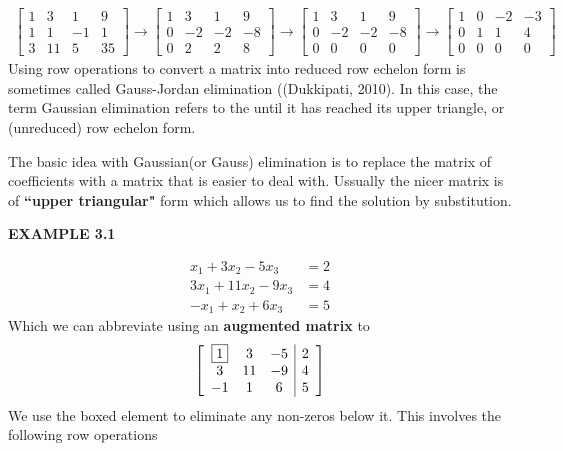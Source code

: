 \documentclass[a4paper, 12pt]{report}
\newcommand{\sps}{\\[0.2cm]}
\begin{document}
{     \begin{align*}
     \begin{bmatrix}1& 3& 1& 9 \\ 1& 1& -1& 1\\ 3& 11& 5& 35 \end{bmatrix}
     \to
     \begin{bmatrix} 1& 3& 1& 9 \\ 0& -2& -2& -8\\ 0& 2& 2& 8 \end{bmatrix}
     \to
     \begin{bmatrix} 1& 3& 1& 9 \\ 0& -2& -2& -8\\ 0& 0& 0& 0 \end{bmatrix}
     \to
     \begin{bmatrix} 1& 0& -2& -3 \\ 0& 1& 1& 4\\ 0& 0& 0& 0 \end{bmatrix}
     \end{align*}
     Using row operations to convert a matrix into reduced row echelon form is sometimes called Gauss-Jordan elimination ((Dukkipati, 2010). In this case, the term Gaussian elimination refers to the until it has reached its upper triangle, or (unreduced) row echelon form.
     \par The basic idea with Gaussian(or Gauss) elimination is to replace the matrix of coefficients with a matrix that is easier to deal with. Ussually the nicer matrix is of \textbf{``upper triangular"} form which allows us to find the solution by substitution.\sps
     \begin{center}
     	\textbf{EXAMPLE 3.1}
     \end{center}   
     \begin{align}
     x_1+3x_2-5x_3&=2\\
     3x_1+11x_2-9x_3&=4\\
     -x_1+x_2+6x_3&=5
     \end{align}
     Which we can abbreviate using an \textbf{augmented matrix} to
     \[
     \left[ \begin{array}{c c c |c}
     \boxed{1}& 3& -5& 2\\
     3& 11& -9& 4\\
     -1& 1& 6& 5
     \end{array} \right]
     \]
     We use the boxed element to eliminate any non-zeros below it. This involves the following row operations
     
}
\end{document}
